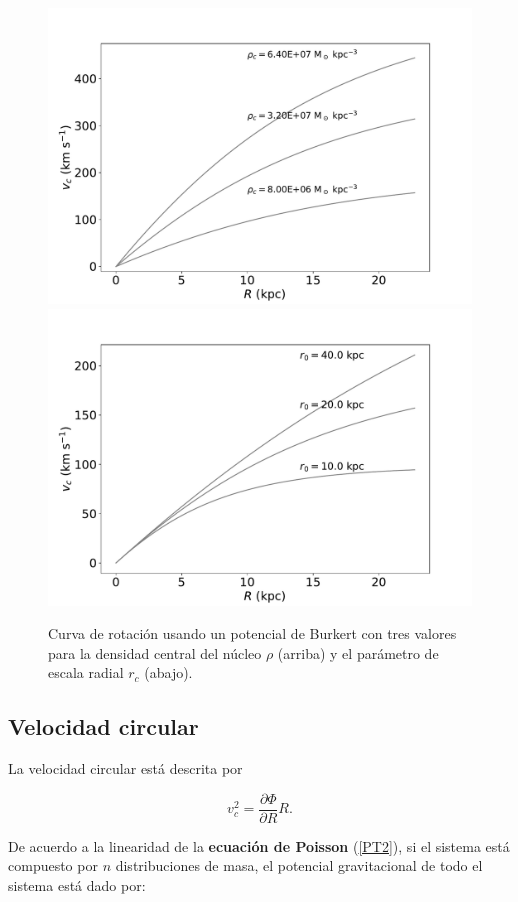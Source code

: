 \begin{figure}
  \centering
    \includegraphics[width=0.8\columnwidth]{Kap2/BK_Amp.pdf}
    \includegraphics[width=0.8\columnwidth]{Kap2/BK_r.pdf}
  \caption{ Curva de rotación usando un potencial de Burkert con tres valores para la densidad central del núcleo $\rho$ (arriba) y el parámetro de escala radial $r_c$ (abajo).}
  \label{fig:Fig_BK_parameters}
\end{figure}

\subsection{Velocidad circular}

La velocidad circular está descrita por

\begin{equation}
\label{CV1}
v_{c}^2 = \frac{\partial \Phi}{\partial R} R.
\end{equation}

De acuerdo a la linearidad de la \textbf{ecuación de Poisson} (\ref{PT2}), si el sistema está compuesto por $n$ distribuciones de masa, el potencial gravitacional de todo el sistema está dado por:

